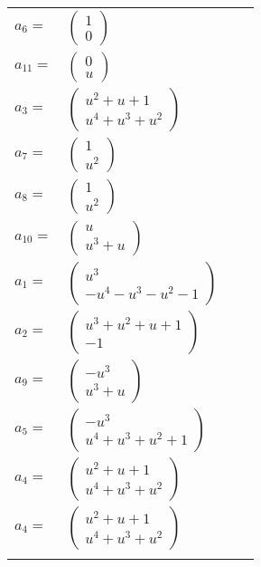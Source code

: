 \documentclass[1p]{elsarticle_modified}
\theoremstyle{definition}
\begin{document}
\begin{tabular}{m{7pt} m{180pt} m{7pt} m{180pt} }
\flushright $a_{6}=$&$\begin{pmatrix}1\\0\end{pmatrix}$ \\
\flushright $a_{11}=$&$\begin{pmatrix}0\\u\end{pmatrix}$ \\
\flushright $a_{3}=$&$\begin{pmatrix}u^2+u+1\\u^4+u^3+u^2\end{pmatrix}$ \\
\flushright $a_{7}=$&$\begin{pmatrix}1\\u^2\end{pmatrix}$ \\
\flushright $a_{8}=$&$\begin{pmatrix}1\\u^2\end{pmatrix}$ \\
\flushright $a_{10}=$&$\begin{pmatrix}u\\u^3+u\end{pmatrix}$ \\
\flushright $a_{1}=$&$\begin{pmatrix}u^3\\- u^4- u^3- u^2-1\end{pmatrix}$ \\
\flushright $a_{2}=$&$\begin{pmatrix}u^3+u^2+u+1\\-1\end{pmatrix}$ \\
\flushright $a_{9}=$&$\begin{pmatrix}- u^3\\u^3+u\end{pmatrix}$ \\
\flushright $a_{5}=$&$\begin{pmatrix}- u^3\\u^4+u^3+u^2+1\end{pmatrix}$ \\
\flushright $a_{4}=$&$\begin{pmatrix}u^2+u+1\\u^4+u^3+u^2\end{pmatrix}$\\ \flushright $a_{4}=$&$\begin{pmatrix}u^2+u+1\\u^4+u^3+u^2\end{pmatrix}$\\&\end{tabular}
\end{document}
